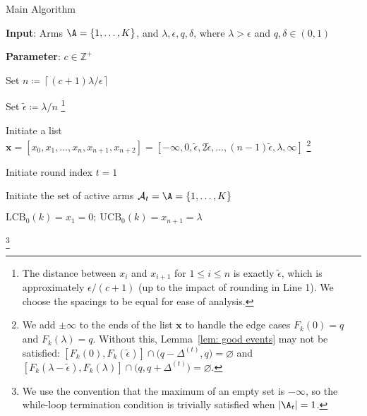 \begin{algorithm}[!t]
    \caption{Main Algorithm}
      \hspace*{\algorithmicindent} \textbf{Input}:
      Arms $\A = \{1, \dots, K\}$,
        and 
        $\lambda, \epsilon, q, \delta$,
        where
        $\lambda > \epsilon$ 
        and $q, \delta \in (0,1)$ 
        
        \hspace*{\algorithmicindent} \textbf{Parameter}: $c \in \mathbb{Z}^+$
    \label{alg: main}
    \begin{algorithmic}[1]
        \State Set 
        $n \coloneqq 
        \left\lceil (c+1) \lambda/\epsilon \right\rceil
        $
        \label{line: number of points}
        
        \State Set 
        $\tilde{\epsilon} \coloneqq    
        \lambda / n
        $  \footnote{The distance between $x_i$ and $x_{i+1}$ for $1 \le i \le n$ is exactly $\tilde{\epsilon}$, which is approximately $\epsilon/(c+1)$ (up to the impact of rounding in Line 1).
    We choose the spacings to be equal for ease of analysis.}
        \label{line: tilde epsilon}
        
        

        \State Initiate a list $\mathbf{x} 
        = [x_0, x_1, \ldots, 
        x_n, x_{n+1}, x_{n+2} ]
        = \left[
        -\infty, 0, 
         \tilde{\epsilon}, 2 \tilde{\epsilon}, 
       \ldots,
        (n-1)  \tilde{\epsilon}, \lambda,
        \infty
        \right]$
        \footnote{
        We add $\pm \infty$ to the ends of the list $\mathbf{x}$ to handle the edge cases
    $F_k(0) = q$ and $F_k(\lambda) = q$. Without this, Lemma~\ref{lem: good events} may not be satisfied:
    $[F_k(0), F_k( \tilde{\epsilon })] \cap  
        \big( q - \Delta^{(t)}, q   \big) = \varnothing$
    and 
    $[F_k(\lambda - \tilde{\epsilon}), F_k(\lambda)] \cap  
        \big( q, q+\Delta^{(t)}  \big) = \varnothing$.}
        \label{line: list of points}

        \State Initiate round index $t = 1$

        \State Initiate the set of active arms $\mathcal{A}_t = \A = \{1, \dots, K \}$

            \State  $\mathrm{LCB}_0(k) = x_1 = 0; \
            \mathrm{UCB}_0(k) = x_{n+1} = \lambda$
            \label{eq: initiate default conf interval}
        \EndFor
                
                \footnote{We use the convention that the maximum of an empty set is $- \infty$, so the while-loop termination condition is trivially satisfied when $|\A_t|= 1$.}


\end{algorithmic}
\end{algorithm}
